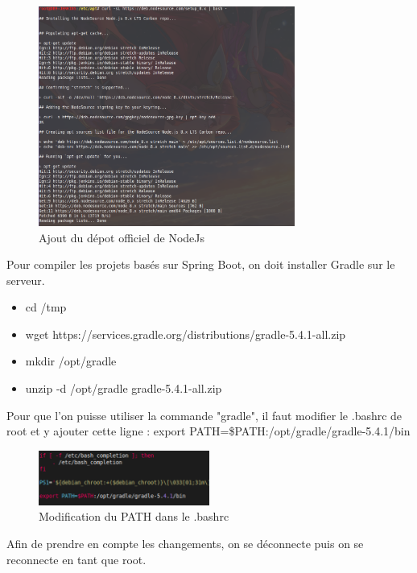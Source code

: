 \documentclass[report]{BetterDocument}
\begin{document}
		\begin{figure}[H]
			\centering\includegraphics[width=0.75\textwidth, keepaspectratio]{res/install-npm.png}
			\caption{Ajout du dépot officiel de NodeJs}
		\end{figure}

		Pour compiler les projets basés sur Spring Boot, on doit installer Gradle sur le serveur.

		\begin{itemize}
			\item{cd /tmp}
			\item{wget https://services.gradle.org/distributions/gradle-5.4.1-all.zip}
 			\item{mkdir /opt/gradle}
			\item{unzip -d /opt/gradle gradle-5.4.1-all.zip}
		\end{itemize}

		Pour que l'on puisse utiliser la commande "gradle", il faut modifier le .bashrc de root et y ajouter cette ligne :
		export PATH=\$PATH:/opt/gradle/gradle-5.4.1/bin

		\begin{figure}[H]
			\centering\includegraphics[width=0.5\textwidth, keepaspectratio]{res/bashrc-path.png}
			\caption{Modification du PATH dans le .bashrc}
		\end{figure}

		Afin de prendre en compte les changements, on se déconnecte puis on se reconnecte en tant que root.
\end{document}
